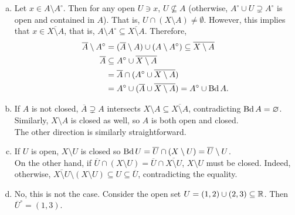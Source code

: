 \begin{solution*}
	\begin{enumerate}[(a)]
		\item Let $x\in A\setminus A^\circ$. Then for any open $U\ni x$, $U\not\subseteq A$ (otherwise, $A^\circ\cup U\supsetneq A^\circ$ is open and contained in $A$). That is, $U\cap (X\setminus A) \neq \emptyset$. However, this implies that $x\in \overline{X\setminus A}$, that is, $A\setminus A^\circ\subseteq \overline{X\setminus A}$. Therefore,
		\begin{align*}
			\overline{A}\setminus A^\circ &= (\overline{A}\setminus A) \cup (A\setminus A^\circ) \subseteq \overline{X\setminus A} \\
			\overline{A} &\subseteq A^\circ \cup \overline{X\setminus A} \\
				&= \overline{A} \cap (A^\circ \cup \overline{X\setminus A}) \\
				&= A^\circ \cup (\overline{A} \cup \overline{X\setminus A}) = A^\circ \cup \operatorname{Bd} A.
		\end{align*} 

		\item If $A$ is not closed, $\overline{A}\supsetneq A$ intersects $X\setminus A\subseteq \overline{X\setminus A}$, contradicting $\operatorname{Bd} A = \varnothing$. Similarly, $X\setminus A$ is closed as well, so $A$ is both open and closed.\\
		The other direction is similarly straightforward.

		\item If $U$ is open, $X\setminus U$ is closed so $\operatorname{Bd} U = \overline{U} \cap (X\setminus U) = \overline{U} \setminus U$.\\
		On the other hand, if $\overline{U}\cap (X\setminus U) = \overline{U}\cap \overline{X\setminus U}$, $X\setminus U$ must be closed. Indeed, otherwise, $\overline{X\setminus U} \setminus (X\setminus U) \subseteq U \subseteq \overline{U}$, contradicting the equality.

		\item No, this is not the case. Consider the open set $U=(1,2)\cup(2,3)\subseteq\mathbb{R}$. Then $\overline{U}^\circ=(1,3)$.
	\end{enumerate}
\end{solution*}